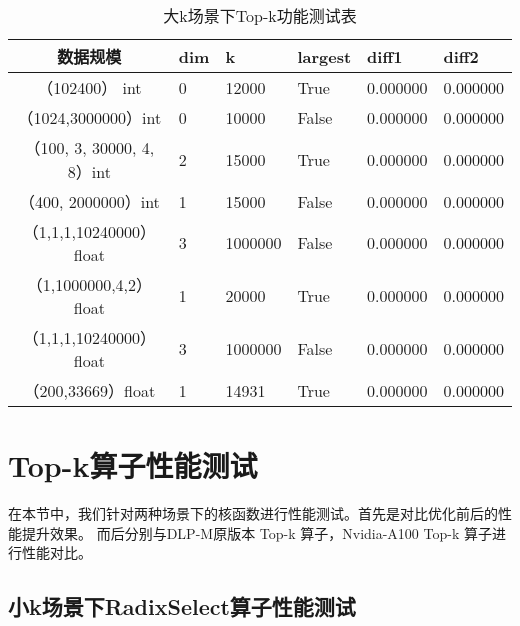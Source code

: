 \begin{table}
    \centering
    \caption{大k场景下Top-k功能测试表}
    \label{tab:presicionbigk}
    \begin{tabular}{clllll}
        \toprule
        数据规模       &dim  & k  & largest & diff1    & diff2 \\
        \midrule
        （102400） int&0&  12000     & True      & 0.000000 & 0.000000 \\
        （1024,3000000）int&0 & 10000 & False      & 0.000000 & 0.000000 \\
        （100, 3, 30000, 4, 8）int&2 & 15000 & True      & 0.000000 & 0.000000 \\
        （400, 2000000）int&1 & 15000 & False      & 0.000000 & 0.000000 \\
        
        （1,1,1,10240000）float &3& 1000000 & False      & 0.000000 & 0.000000 \\
        （1,1000000,4,2）float  &1 & 20000 & True      & 0.000000 & 0.000000 \\
        （1,1,1,10240000）float&3 & 1000000 & False      & 0.000000 & 0.000000 \\
        （200,33669）float&1 & 14931 & True      & 0.000000 & 0.000000 \\
    
    \bottomrule
    \end{tabular}
    \end{table}

\section{Top-k算子性能测试}
在本节中，我们针对两种场景下的核函数进行性能测试。首先是对比优化前后的性能提升效果。
而后分别与DLP-M原版本 Top-k 算子，Nvidia-A100 Top-k 算子进行性能对比。
\subsection{小k场景下RadixSelect算子性能测试}

